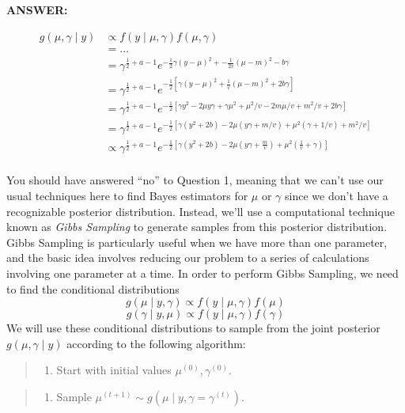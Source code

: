 \documentclass[
]{article}
\providecommand{\tightlist}{%
  \setlength{\itemsep}{0pt}\setlength{\parskip}{0pt}}
\begin{document}
\textbf{ANSWER:}

\[
\begin{aligned}
g(\mu,\gamma \mid y) & \propto f(y \mid \mu, \gamma) f(\mu, \gamma) \\
& = \dots \\
& =\gamma^{\frac{1}{2} + a - 1}e^{-\frac{1}{2}\gamma(y - \mu)^2 + -\frac{1}{2v}(\mu - m)^2 -b\gamma} \\
& = \gamma^{\frac{1}{2} + a - 1}e^{-\frac{1}{2}\left[\gamma(y - \mu)^2 + \frac{1}{v}(\mu - m)^2 + 2b\gamma\right]} \\
& = \gamma^{\frac{1}{2} + a - 1}e^{-\frac{1}{2}\left[\gamma y^2 - 2\mu y \gamma + \gamma \mu^2 + \mu^2 / v - 2m \mu / v + m^2 / v + 2 b \gamma\right]} \\
& = \gamma^{\frac{1}{2} + a - 1}e^{-\frac{1}{2}\left[\gamma (y^2 + 2b) - 2\mu (y \gamma + m/v) + \mu^2(\gamma  + 1 / v)  + m^2 / v \right]} \\
& \propto \gamma^{\frac{1}{2}+a-1}e^{-\frac{1}{2}\left[\gamma(y^2 + 2b) - 2\mu(y\gamma + \frac{m}{v}) + \mu^2(\frac{1}{v}+ \gamma) \right]} \\
\end{aligned}
\]

You should have answered ``no'' to Question 1, meaning that we can't use
our usual techniques here to find Bayes estimators for \(\mu\) or
\(\gamma\) since we don't have a recognizable posterior distribution.
Instead, we'll use a computational technique known as \emph{Gibbs
Sampling} to generate samples from this posterior distribution. Gibbs
Sampling is particularly useful when we have more than one parameter,
and the basic idea involves reducing our problem to a series of
calculations involving one parameter at a time. In order to perform
Gibbs Sampling, we need to find the conditional distributions
\[g(\mu \mid y, \gamma) \propto f(y \mid \mu, \gamma)f(\mu)\]
\[g(\gamma \mid y, \mu) \propto f(y \mid \mu,\gamma)f(\gamma)\] We will
use these conditional distributions to sample from the joint posterior
\(g(\mu, \gamma \mid y)\) according to the following algorithm:

\begin{quote}
\begin{enumerate}
\def\labelenumi{(\arabic{enumi})}
\tightlist
\item
  Start with initial values \(\mu^{(0)}, \gamma^{(0)}\).
\end{enumerate}
\end{quote}

\begin{quote}
\begin{enumerate}
\def\labelenumi{(\arabic{enumi})}
\setcounter{enumi}{1}
\tightlist
\item
  Sample \(\mu^{(t+1)} \sim g(\mu \mid y, \gamma = \gamma^{(t)})\).
\end{enumerate}
\end{quote}
\end{document}
